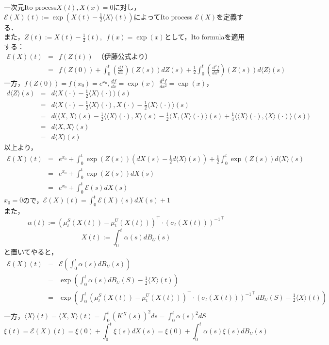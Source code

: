 \documentclass[a4paper,11pt]{jsarticle}
\numberwithin{theorem}{section}  %
\numberwithin{equation}{section} %
\begin{document}
一次元Ito process$X(t),X(x)=0$に対し，$\mathcal{E}(X)(t):=\exp(X(t)-\frac{1}{2}\langle X\rangle(t))$によってIto process\,\,$\mathcal{E}(X)$を定義する．\\
また，$Z(t) := X(t) - \frac{1}{2}(t),\,\,\,f(x)=\exp(x)$として，Ito formulaを適用する：
\begin{eqnarray*}
\mathcal{E}(X)(t)&=&f(Z(t))  \,\,\,\,\text{（伊藤公式より）}\\
&=&f(Z(0)) + \int_0^t(\frac{df}{dx})(Z(s))dZ(s) + \frac{1}{2}\int_0^t (\frac{d^2f}{dx^2})(Z(s))d\langle Z \rangle (s)
\end{eqnarray*}
一方，$f(Z(0))=f(x_0)=e^{x_0},\frac{df}{dx}=\exp(x)\,\,\, \frac{d^2f}{dx^2}=\exp(x)$，
\begin{eqnarray*}
d\langle Z \rangle(s) &=& d\Bigr\langle X(\cdot) - \frac{1}{2}\langle X \rangle(\cdot) \Bigr\rangle(s)\\
&=& d\Bigr\langle X(\cdot) - \frac{1}{2}\langle X \rangle(\cdot), X(\cdot) - \frac{1}{2}\langle X \rangle(\cdot) \Bigr\rangle(s)\\
&=& d\Bigr(
\langle X,X \rangle (s) - \frac{1}{2}\langle \langle X \rangle(\cdot), X \rangle(s) - \frac{1}{2}\langle X, \langle X \rangle(\cdot) \rangle(s) + \frac{1}{4}\langle \langle X \rangle(\cdot), \langle X \rangle(\cdot) \rangle(s) \Bigr)\\
&=& d\langle X,X \rangle(s)\\
&=& d\langle X \rangle(s)
\end{eqnarray*}
以上より，
\begin{eqnarray*}
\mathcal{E}(X)(t)&=& e^{x_0} + \int_0^t \exp(Z(s))(dX(s) - \frac{1}{2}d\langle X \rangle(s)) + \frac{1}{2}\int_0^t \exp(Z(s))d\langle X \rangle(s) \\
&=& e^{x_0} + \int_0^t \exp(Z(s))dX(s)\\
&=& e^{x_0} + \int_0^t \mathcal{E}(s)dX(s)
\end{eqnarray*}
$x_0=0$ので，$\mathcal{E}(X)(t) = \int_0^t \mathcal{E}(X)(s)dX(s) +1$\\
また，\[\alpha(t) := (\mu_t^S(X(t)) -\mu_t^U(X(t)))^\intercal \cdot {(\sigma_t(X(t)))^{-1}}^\intercal\]
\[
X(t):=\int_0^t \alpha(s) d B_U(s)
\]と置いてやると，
\begin{eqnarray*}
\mathcal{E}(X)(t) &=& \mathcal{E}(\int_0^t \alpha(s) d B_U(s) )\\
&=& \exp (\int_0^t\alpha(s)dB_U(S) - \frac{1}{2}\langle X \rangle(t))\\
&=& \exp (\int_0^t(\mu_t^S(X(t)) -\mu_t^U(X(t)))^\intercal \cdot {(\sigma_t(X(t)))^{-1}}^\intercal dB_U(S) - \frac{1}{2}\langle X \rangle(t))\\
\end{eqnarray*}
一方，$\langle X \rangle(t) = \langle X, X \rangle(t) = \int_0^t (K^X(s))^2 ds = \int_0^t \alpha(s)^2 dS$\\
\[
\xi(t) = \mathcal{E}(X)(t) =  \xi(0) + \int_0^t \xi(s)dX(s) =  \xi(0) + \int_0^t \alpha(s)\xi(s)dB_U(s)
\]
\end{document}
